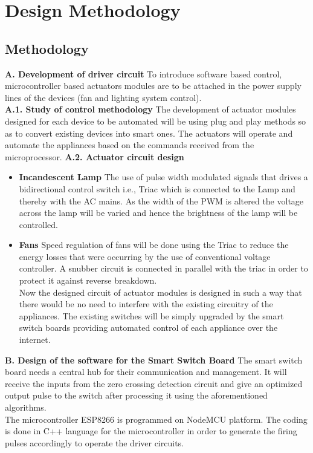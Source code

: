  \chapter{Design Methodology}
        \section{Methodology}
        \textbf{A. Development of driver circuit} To introduce software based control, microcontroller based actuators modules are to be attached in the power supply lines of the devices (fan and lighting system control).\\
        \textbf{A.1. Study of control methodology} The development of actuator modules designed for each device to be automated will be using plug and play methods so as to convert existing devices into smart ones. The actuators will operate and automate the appliances based on the commands received from the microprocessor.
        \textbf{A.2. Actuator circuit design} \begin{itemize}
        \item \textbf{Incandescent Lamp} The use of pulse width modulated signals that drives a bidirectional control switch i.e., Triac which is connected to the Lamp and thereby with the AC mains. As the width of the PWM is altered the voltage across the lamp will be varied and hence the brightness of the lamp will be controlled.
         \item \textbf{Fans} Speed regulation of fans will be done using the Triac to reduce the energy losses that were occurring by the use of conventional voltage controller. A snubber circuit is connected in parallel with the triac in order to protect it against reverse breakdown.\\
         Now the designed circuit of actuator modules is designed in such a way that there would be no need to interfere with the existing circuitry of the appliances. The existing switches will be simply upgraded by the smart switch boards providing automated control of each appliance over the internet.
        \end{itemize}
        \textbf{B.  Design of the software for the Smart Switch Board}
        The smart switch board needs a central hub for their communication and management. It will receive the inputs from the zero crossing detection circuit and give an optimized output pulse to the switch after processing it using the aforementioned algorithms.\\
        The microcontroller ESP8266 is programmed on NodeMCU platform. The coding is done in C++ language for the microcontroller in order to generate the firing pulses accordingly to operate the driver circuits.\\
